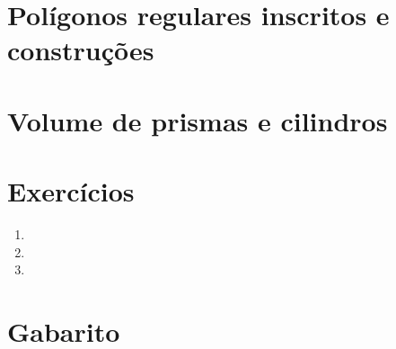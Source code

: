 \documentclass[11pt,a4paper]{article}
\begin{document}
\section{Polígonos regulares inscritos e construções}

\section{Volume de prismas e cilindros}


\section{Exercícios}
\begin{enumerate}[label=\textbf{\arabic*.}]
  \item %
  \item %
  \item %
\end{enumerate}

\begin{desafio}
\end{desafio}

\section*{Gabarito}
\end{document}
